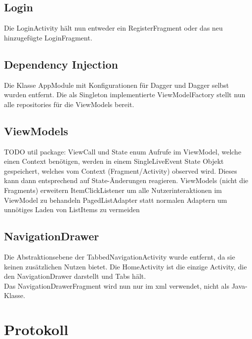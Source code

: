 \documentclass[parskip=full,11pt]{scrartcl}
\begin{document}
\subsection{Login}
Die LoginActivity hält nun entweder ein RegisterFragment oder das neu
hinzugefügte LoginFragment.

\subsection{Dependency Injection}
Die Klasse AppModule mit Konfigurationen für Dagger und Dagger selbst
wurden entfernt. Die als Singleton implementierte ViewModelFactory stellt
nun alle repositories für die ViewModels bereit.

\subsection{ViewModels}
TODO
util package: ViewCall und State enum
Aufrufe im ViewModel, welche einen Context benötigen, werden in einem SingleLiveEvent State Objekt gespeichert, welches vom Context (Fragment/Activity) observed wird. Dieses kann dann entsprechend auf State-Änderungen reagieren.
ViewModels (nicht die Fragments) erweitern ItemClickListener um alle Nutzerinteraktionen im ViewModel zu behandeln
PagedListAdapter statt normalen Adaptern um unnötiges Laden von ListItems zu vermeiden

\subsection{NavigationDrawer}
Die Abstraktionsebene der TabbedNavigationActivity wurde entfernt, da
sie keinen zusätzlichen Nutzen bietet. Die HomeActivity ist die einzige
Activity, die den NavigationDrawer darstellt und Tabs hält.\\
Das NavigationDrawerFragment wird nun nur im xml verwendet, nicht als Java-Klasse.


\pagebreak
\section{Protokoll}
\end{document}
